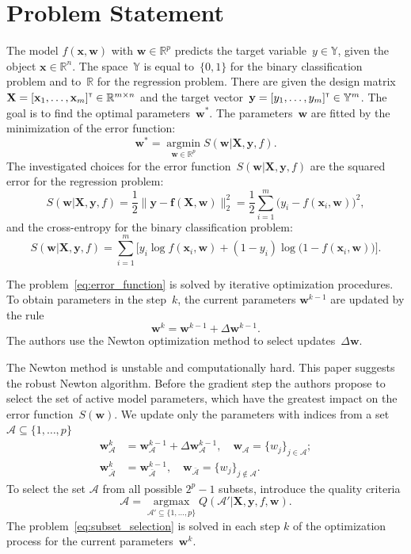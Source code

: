 \documentclass[
11pt,%
tightenlines,%
twoside,%
onecolumn,%
nofloats,%
nobibnotes,%
nofootinbib,%
superscriptaddress,%
noshowpacs,%
centertags]%
{revtex4}
\newcommand{\bw}{\mathbf{w}}
\newcommand{\by}{\mathbf{y}}
\newcommand{\bx}{\mathbf{x}}
\newcommand{\cA}{\mathcal{A}}
\newcommand{\bbR}{\mathbb{R}}
\newcommand{\bbY}{\mathbb{Y}}
\newcommand{\bX}{\mathbf{X}}
\newcommand{\T}{{\text{\tiny\sffamily\upshape\mdseries T}}}
\newcommand{\argmin}{\mathop{\arg \min}\limits}
\newcommand{\argmax}{\mathop{\arg \max}\limits}
\begin{document}
\section{Problem Statement}
The model $f( \bx, \bw)$ with $\bw \in \mathbb{R}^p$ predicts the target variable~$y \in \bbY$, given the object $\bx \in \bbR^{n}$. The space~$\bbY$ is equal to~$\{0, 1\}$ for the binary classification problem and to~$\bbR$ for the regression problem.
There are given the design matrix~$\bX = [\bx_1, \dots, \bx_m]^{\T} \in \bbR^{m \times n}$ and the target vector~$\by = [y_1, \dots, y_m]^{\T} \in \bbY^{m}$. 
The goal is to find the optimal parameters~$\bw^*$.
The parameters~$\bw$ are fitted by the minimization of the error function:
\begin{equation}
\bw^* = \argmin_{\bw \in \bbR^p} S(\bw | \bX, \by, f).
\label{eq:error_function}
\end{equation}
The investigated choices for the error function~$S(\bw | \bX, \by, f)$ are
the squared error for the regression problem: 
\begin{equation}
S(\bw | \bX, \by, f) = \frac 12 \| \by - \mathbf{f}(\bX, \bw) \|_2^2 = \frac 12 \sum_{i=1}^m \bigl( y_i - f(\bx_i,  \bw)\bigr)^2,
\label{eq:squared_error}
\end{equation}
and the cross-entropy for the binary classification problem: 
\begin{equation}
S(\bw | \bX, \by, f) = \sum_{i=1}^m \bigl[y_i \log f (\bx_i , \bw) + (1-y_i) \log \bigl(1 - f (\bx_i , \bw)\bigr)\bigr].
\label{eq:log_loss}
\end{equation}

The problem~\eqref{eq:error_function} is solved by iterative optimization procedures. 
To obtain parameters in the step~$k$, the current parameters $\bw^{k-1}$ are updated by the rule
\begin{equation}
\bw^k = \bw^{k - 1} + \Delta \bw^{k - 1}.
\label{eq:update_rule}
\end{equation}
The authors use the Newton optimization method to select  updates~$\Delta \bw$.

The Newton method is unstable and computationally hard. 
This paper suggests the robust Newton algorithm. 
Before the gradient step the authors propose to select the set of active model parameters, which have the greatest impact on the error function~$S(\bw)$.
We update only the parameters with indices from a set $\cA \subseteq \{ 1, \dots, p \}$
\begin{align*}
\bw_{\cA}^k &= \bw_{\cA}^{k - 1} + \Delta \bw_{\cA}^{k - 1}, \quad \bw_{\cA} = \{w_j\}_{j \in \cA}; \\
\bw_{\bar{\cA}}^k &= \bw_{\bar{\cA}}^{k - 1}, \quad \bw_{\bar{\cA}} = \{w_j\}_{j \notin \cA}.
\end{align*}
To select the set $\cA$ from all possible $2^p - 1$ subsets, introduce the quality criteria 
\begin{equation}
\cA = \argmax_{\cA' \subseteq \{1, \dots, p\}} Q(\cA' | \bX, \by, f, \bw).
\label{eq:subset_selection}
\end{equation}
The problem~\eqref{eq:subset_selection} is solved in each step $k$ of the optimization process for the current parameters~$\bw^k$.
\end{document}
